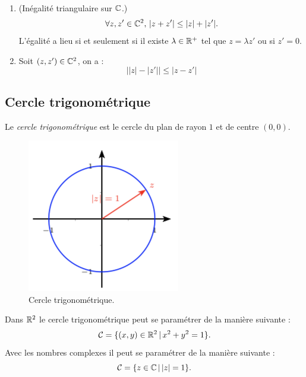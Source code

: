 \documentclass[a4paper, 11pt]{article}
\begin{document}
\begin{prop}
\begin{enumerate}
\item (Inégalité triangulaire sur $\mathbb{C}$.) 
$$ \forall z, z' \in \mathbb{C}^2, \, |z+z'| \leq |z|+|z'|.$$
L'égalité a lieu si et seulement si il existe $\lambda \in \mathbb{R}^+$ tel que $z =\lambda z'$ ou si $z'=0$.
\item Soit $(z,z') \in \mathbb{C}^2$, on a  :
$$\Big| |z|-|z'|\Big| \leq |z-z'|$$
\end{enumerate}
\end{prop}



\subsection{Cercle trigonométrique}

\begin{defi}
Le \emph{cercle trigonométrique} est le cercle du plan de rayon $1$ et de centre $(0,0)$. 
\end{defi}
\begin{figure}[h]
\centering
\includegraphics[scale=0.8]{images/cercletrigo}
\vspace{-0.4cm}
\caption{Cercle trigonométrique.}
\end{figure}

\begin{prop}
Dans $\mathbb{R}^2$ le cercle trigonométrique peut se paramétrer de la manière suivante : 
$$\mathcal{C} = \{ (x,y) \in \mathbb{R}^2\, |\, x^2+y^2=1\}.$$
Avec les nombres complexes il peut se paramétrer de la manière suivante : 
$$\mathcal{C} = \{ z \in \mathbb{C}\, |\, |z|=1\}.$$
\end{prop}
\end{document}
